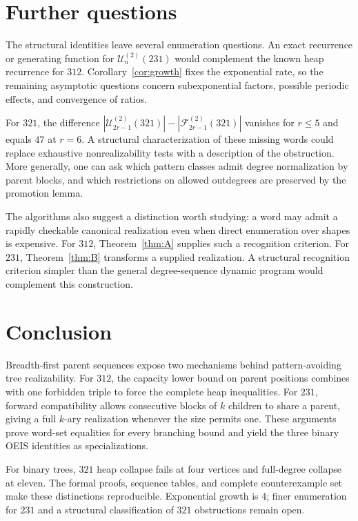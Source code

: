 \documentclass[11pt]{article}
\theoremstyle{definition}
\newcommand{\UB}{\mathcal U}
\newcommand{\FB}{\mathcal F}
\begin{document}
\section{Further questions}\label{sec:questions}

The structural identities leave several enumeration questions. An exact recurrence or generating function for $\UB_n^{(2)}(231)$ would complement the known heap recurrence for $312$. Corollary~\ref{cor:growth} fixes the exponential rate, so the remaining asymptotic questions concern subexponential factors, possible periodic effects, and convergence of ratios.

For $321$, the difference
$|\UB_{2r-1}^{(2)}(321)|-|\FB_{2r-1}^{(2)}(321)|$
vanishes for $r\le5$ and equals $47$ at $r=6$. A structural characterization of these missing words could replace exhaustive nonrealizability tests with a description of the obstruction. More generally, one can ask which pattern classes admit degree normalization by parent blocks, and which restrictions on allowed outdegrees are preserved by the promotion lemma.

The algorithms also suggest a distinction worth studying: a word may admit a rapidly checkable canonical realization even when direct enumeration over shapes is expensive. For $312$, Theorem~\ref{thm:A} supplies such a recognition criterion. For $231$, Theorem~\ref{thm:B} transforms a supplied realization. A structural recognition criterion simpler than the general degree-sequence dynamic program would complement this construction.

\section{Conclusion}

Breadth-first parent sequences expose two mechanisms behind pattern-avoiding tree realizability. For $312$, the capacity lower bound on parent positions combines with one forbidden triple to force the complete heap inequalities. For $231$, forward compatibility allows consecutive blocks of $k$ children to share a parent, giving a full $k$-ary realization whenever the size permits one. These arguments prove word-set equalities for every branching bound and yield the three binary OEIS identities as specializations.

For binary trees, $321$ heap collapse fails at four vertices and full-degree collapse at eleven. The formal proofs, sequence tables, and complete counterexample set make these distinctions reproducible. Exponential growth is $4$; finer enumeration for $231$ and a structural classification of $321$ obstructions remain open.
\end{document}
